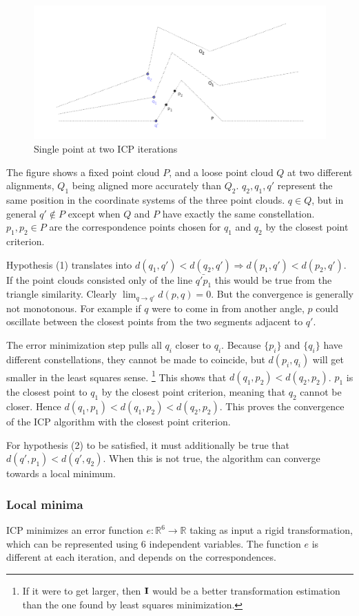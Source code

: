 \begin{figure}
\includegraphics[width=.5\textwidth]{fig/icp_true_approx_cor.pdf}
\caption{Single point at two ICP iterations}
\label{fig:icp_true_approx_cor}
\end{figure}
The figure shows a fixed point cloud $P$, and a loose point cloud $Q$ at two different alignments, $Q_1$ being aligned more accurately than $Q_2$. $q_2, q_1, q'$ represent the same position in the coordinate systems of the three point clouds. $q \in Q$, but in general $q' \notin P$ except when $Q$ and $P$ have exactly the same constellation.
$p_1, p_2 \in P$ are the correspondence points chosen for $q_1$ and $q_2$ by the closest point criterion.

Hypothesis (1) translates into $d(q_1, q') < d(q_2, q') \Rightarrow d(p_1, q') < d(p_2, q')$. If the point clouds consisted only of the line $\bar{q' p_1}$ this would be true from the triangle similarity. Clearly $\lim_{q \rightarrow q'} d(p, q) = 0$. But the convergence is generally not monotonous. For example if $q$ were to come in from another angle, $p$ could oscillate between the closest points from the two segments adjacent to $q'$.

The error minimization step pulls all $q_i$ closer to $q_i$. Because $\{ p_i \}$ and $\{ q_i \}$ have different constellations, they cannot be made to coincide, but $d(p_i, q_i)$ will get smaller in the least squares sense. \footnote{If it were to get larger, then $\mathbf{I}$ would be a better transformation estimation than the one found by least squares minimization.} This shows that $d(q_1, p_2) < d(q_2, p_2)$. $p_1$ is the closest point to $q_1$ by the closest point criterion, meaning that $q_2$ cannot be closer. Hence $d(q_1, p_1) < d(q_1, p_2) < d(q_2, p_2)$. This proves the convergence of the ICP algorithm with the closest point criterion.

For hypothesis (2) to be satisfied, it must additionally be true that $d(q', p_1) < d(q', q_2)$. When this is not true, the algorithm can converge towards a local minimum.



\subsubsection{Local minima}
ICP minimizes an error function $e : \mathbb{R}^6 \rightarrow \mathbb{R}$ taking as input a rigid transformation, which can be represented using $6$ independent variables. The function $e$ is different at each iteration, and depends on the correspondences.


